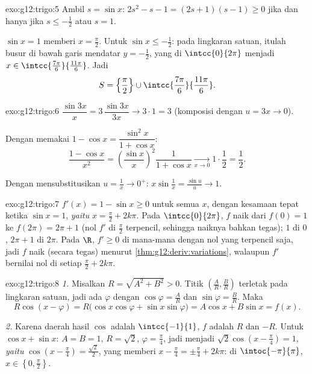 \begin{solution}{exo:g12:trigo:5}
Ambil $s = \sin x$: $2s^2 - s - 1 = (2s + 1)(s - 1) \geq 0$ jika dan hanya jika
$s \leq -\frac12$ atau $s = 1$.

$\sin x = 1$ memberi $x = \frac\pi2$. Untuk $\sin x \leq -\frac12$: pada
lingkaran satuan, itulah busur di bawah garis mendatar $y = -\frac12$, yang di
$\intcc{0}{2\pi}$ menjadi $x \in \intcc{\frac{7\pi}{6}}{\frac{11\pi}{6}}$.
Jadi
\[
S = \left\{\frac{\pi}{2}\right\} \cup
\intcc{\frac{7\pi}{6}}{\frac{11\pi}{6}} .
\]
\end{solution}

\begin{solution}{exo:g12:trigo:6}
$\dfrac{\sin 3x}{x} = 3\,\dfrac{\sin 3x}{3x} \to 3 \cdot 1 = 3$
(komposisi dengan $u = 3x \to 0$).

Dengan memakai $1 - \cos x = \dfrac{\sin^2 x}{1 + \cos x}$:
\[
\frac{1 - \cos x}{x^2}
= \left(\frac{\sin x}{x}\right)^{\!2} \frac{1}{1 + \cos x}
\xrightarrow[x\to0]{} 1 \cdot \frac12 = \frac12 .
\]

Dengan mensubstitusikan $u = \frac1x \to 0^+$:
$x \sin\frac1x = \frac{\sin u}{u} \to 1$.
\end{solution}

\begin{solution}{exo:g12:trigo:7}
$f'(x) = 1 - \sin x \geq 0$ untuk semua $x$, dengan kesamaan tepat ketika
$\sin x = 1$, \emph{yaitu} $x = \frac\pi2 + 2k\pi$. Pada $\intcc{0}{2\pi}$, $f$
naik dari $f(0) = 1$ ke $f(2\pi) = 2\pi + 1$ (nol $f'$ di
$\frac{\pi}{2}$ terpencil, sehingga naiknya bahkan tegas);  $1$ di
$0$,  $2\pi + 1$ di $2\pi$. Pada $\R$, $f' \geq 0$ di mana-mana dengan
nol yang terpencil saja, jadi $f$ naik (secara tegas) menurut
\cref{thm:g12:deriv:variations}, walaupun $f'$ bernilai nol di setiap
$\frac\pi2 + 2k\pi$.
\end{solution}

\begin{solution}{exo:g12:trigo:8}
\emph{1.} Misalkan $R = \sqrt{A^2 + B^2} > 0$. Titik
$\left(\frac AR, \frac BR\right)$ terletak pada lingkaran satuan, jadi ada
$\varphi$ dengan $\cos\varphi = \frac AR$ dan $\sin\varphi = \frac BR$. Maka
\[
R\cos(x - \varphi) = R\bigl(\cos x\cos\varphi + \sin x \sin\varphi\bigr)
= A\cos x + B\sin x = f(x).
\]

\emph{2.} Karena daerah hasil $\cos$ adalah $\intcc{-1}{1}$,  $f$ adalah $R$
dan  $-R$. Untuk $\cos x + \sin x$: $A = B = 1$, $R = \sqrt2$,
$\varphi = \frac\pi4$, jadi  menjadi
$\sqrt2\cos\left(x - \frac\pi4\right) = 1$, \emph{yaitu}
$\cos\left(x - \frac\pi4\right) = \frac{\sqrt2}{2}$, yang memberi
$x - \frac\pi4 = \pm\frac\pi4 + 2k\pi$: di $\intoc{-\pi}{\pi}$,
$x \in \left\{0, \frac\pi2\right\}$.
\end{solution}

